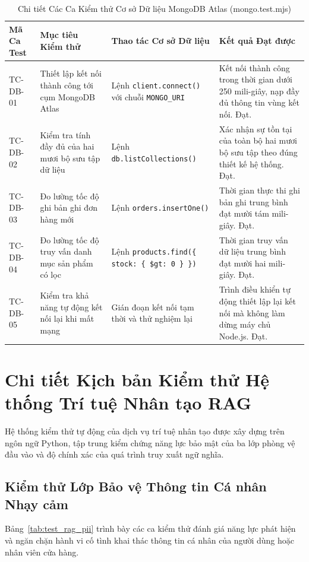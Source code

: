 \begin{table}[H]
\centering
\caption{Chi tiết Các Ca Kiểm thử Cơ sở Dữ liệu MongoDB Atlas (mongo.test.mjs)}
\label{tab:test_mongo_spec}
\begin{tabularx}{\textwidth}{p{2cm}p{3.8cm}p{3cm}X}
\toprule
\textbf{Mã Ca Test} & \textbf{Mục tiêu Kiểm thử} & \textbf{Thao tác Cơ sở Dữ liệu} & \textbf{Kết quả Đạt được} \\
\midrule
TC-DB-01 & Thiết lập kết nối thành công tới cụm MongoDB Atlas & Lệnh \texttt{client.connect()} với chuỗi \texttt{MONGO\_URI} & Kết nối thành công trong thời gian dưới 250 mili-giây, nạp đầy đủ thông tin vùng kết nối. Đạt. \\
\addlinespace
TC-DB-02 & Kiểm tra tính đầy đủ của hai mươi bộ sưu tập dữ liệu & Lệnh \texttt{db.listCollections()} & Xác nhận sự tồn tại của toàn bộ hai mươi bộ sưu tập theo đúng thiết kế hệ thống. Đạt. \\
\addlinespace
TC-DB-03 & Đo lường tốc độ ghi bản ghi đơn hàng mới & Lệnh \texttt{orders.insertOne()} & Thời gian thực thi ghi bản ghi trung bình đạt mười tám mili-giây. Đạt. \\
\addlinespace
TC-DB-04 & Đo lường tốc độ truy vấn danh mục sản phẩm có lọc & Lệnh \texttt{products.find(\{ stock: \{ \$gt: 0 \} \})} & Thời gian truy vấn dữ liệu trung bình đạt mười hai mili-giây. Đạt. \\
\addlinespace
TC-DB-05 & Kiểm tra khả năng tự động kết nối lại khi mất mạng & Gián đoạn kết nối tạm thời và thử nghiệm lại & Trình điều khiển tự động thiết lập lại kết nối mà không làm dừng máy chủ Node.js. Đạt. \\
\bottomrule
\end{tabularx}
\end{table}

\section{Chi tiết Kịch bản Kiểm thử Hệ thống Trí tuệ Nhân tạo RAG}
Hệ thống kiểm thử tự động của dịch vụ trí tuệ nhân tạo được xây dựng trên ngôn ngữ Python, tập trung kiểm chứng năng lực bảo mật của ba lớp phòng vệ đầu vào và độ chính xác của quá trình truy xuất ngữ nghĩa.

\subsection{Kiểm thử Lớp Bảo vệ Thông tin Cá nhân Nhạy cảm}
Bảng~\ref{tab:test_rag_pii} trình bày các ca kiểm thử đánh giá năng lực phát hiện và ngăn chặn hành vi cố tình khai thác thông tin cá nhân của người dùng hoặc nhân viên cửa hàng.

